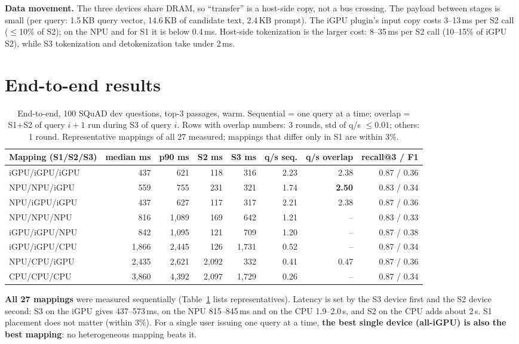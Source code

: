 \documentclass[10pt]{article}
\begin{document}
\textbf{Data movement.} The three devices share DRAM, so ``transfer'' is a host-side copy, not a bus crossing. The
payload between stages is small (per query: 1.5\,KB query vector, 14.6\,KB of candidate text, 2.4\,KB prompt).
The iGPU plugin's input copy costs 3--13\,ms per S2 call ($\le$10\% of S2); on the NPU and for S1 it is below
0.4\,ms. Host-side tokenization is the larger cost: 8--35\,ms per S2 call (10--15\% of iGPU S2), while S3
tokenization and detokenization take under 2\,ms.

\section{End-to-end results}

\begin{table}[t]
\centering\small
\caption{End-to-end, 100 SQuAD dev questions, top-3 passages, warm. Sequential = one query at a time;
overlap = S1+S2 of query $i{+}1$ run during S3 of query $i$. Rows with overlap numbers: 3 rounds, std of q/s $\le 0.01$; others: 1 round.
Representative mappings of all 27 measured; mappings that differ only in S1 are within 3\%.}
\label{tab:e2e}
\begin{tabular}{lrrrrrrr}
\toprule
Mapping (S1/S2/S3) & median ms & p90 ms & S2 ms & S3 ms & q/s seq. & q/s overlap & recall@3 / F1 \\
\midrule
iGPU/iGPU/iGPU & 437 & 621 & 118 & 316 & 2.23 & 2.38 & 0.87 / 0.36 \\
NPU/NPU/iGPU   & 559 & 755 & 231 & 321 & 1.74 & \textbf{2.50} & 0.83 / 0.34 \\
NPU/iGPU/iGPU  & 437 & 627 & 117 & 317 & 2.21 & 2.38 & 0.87 / 0.36 \\
NPU/NPU/NPU    & 816 & 1{,}089 & 169 & 642 & 1.21 & -- & 0.83 / 0.33 \\
iGPU/iGPU/NPU  & 842 & 1{,}095 & 121 & 709 & 1.20 & -- & 0.87 / 0.38 \\
iGPU/iGPU/CPU  & 1{,}866 & 2{,}445 & 126 & 1{,}731 & 0.52 & -- & 0.87 / 0.34 \\
NPU/CPU/iGPU   & 2{,}435 & 2{,}621 & 2{,}092 & 332 & 0.41 & 0.47 & 0.87 / 0.36 \\
CPU/CPU/CPU    & 3{,}860 & 4{,}392 & 2{,}097 & 1{,}729 & 0.26 & -- & 0.87 / 0.34 \\
\bottomrule
\end{tabular}
\end{table}

\textbf{All 27 mappings} were measured sequentially (Table~\ref{tab:e2e} lists representatives). Latency is set by the
S3 device first and the S2 device second: S3 on the iGPU gives 437--573\,ms, on the NPU 815--845\,ms and on the CPU
1.9--2.0\,s, and S2 on the CPU adds about 2\,s. S1 placement does not matter (within 3\%). For a single user issuing
one query at a time, \textbf{the best single device (all-iGPU) is also the best mapping}: no heterogeneous mapping beats it.
\end{document}
